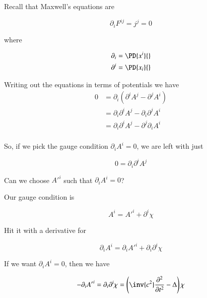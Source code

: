 Recall that Maxwell's equations are

\begin{equation}\label{eqn:relativisticElectrodynamicsL14:410}
\partial_i F^{ij} = j^j = 0
\end{equation}

where 

\begin{align}\label{eqn:relativisticElectrodynamicsL14:430}
\partial_i &= \PD{x^i}{} \\
\partial^i &= \PD{x_i}{}
\end{align}

Writing out the equations in terms of potentials we have
\begin{align*}
0 &= \partial_i (\partial^i A^j - \partial^j A^i)  \\
&= \partial_i \partial^i A^j - \partial_i \partial^j A^i \\
&= \partial_i \partial^i A^j - \partial^j \partial_i A^i \\
\end{align*}

So, if we pick the gauge condition $\partial_i A^i = 0$, we are left with just 

\begin{equation}\label{eqn:relativisticElectrodynamicsL14:450}
0 = \partial_i \partial^i A^j
\end{equation}

Can we choose ${A'}^i$ such that $\partial_i A^i = 0$?

Our gauge condition is 

\begin{equation}\label{eqn:relativisticElectrodynamicsL14:470}
A^i = {A'}^i + \partial^i \chi
\end{equation}

Hit it with a derivative for

\begin{equation}\label{eqn:relativisticElectrodynamicsL14:490}
\partial_i A^i = \partial_i {A'}^i + \partial_i \partial^i \chi
\end{equation}

If we want $\partial_i A^i = 0$, then we have

\begin{equation}\label{eqn:relativisticElectrodynamicsL14:510}
-\partial_i {A'}^i = \partial_i \partial^i \chi = \left( \inv{c^2} \frac{\partial^2}{\partial t^2} - \Delta \right) \chi
\end{equation}

